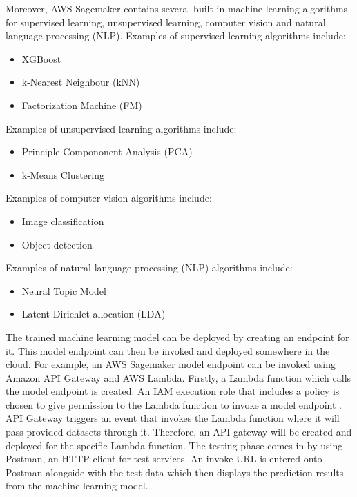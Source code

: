 Moreover, AWS Sagemaker contains several built-in machine learning algorithms for supervised learning, unsupervised learning, computer vision and natural language processing (NLP). Examples of supervised learning algorithms include:
\begin{itemize}
    \item XGBoost
    \item k-Nearest Neighbour (kNN)
    \item Factorization Machine (FM)
\end{itemize}
Examples of unsupervised learning algorithms include:
\begin{itemize}
    \item Principle Compononent Analysis (PCA)
    \item k-Means Clustering
\end{itemize}
Examples of computer vision algorithms include:
\begin{itemize}
    \item Image classification
    \item Object detection
\end{itemize}
Examples of natural language processing (NLP) algorithms include:
\begin{itemize}
    \item Neural Topic Model
    \item Latent Dirichlet allocation (LDA)
\end{itemize}
The trained machine learning model can be deployed by creating an endpoint for it. This model endpoint can then be invoked and deployed somewhere in the cloud. For example, an AWS Sagemaker model endpoint can be invoked using Amazon API Gateway and AWS Lambda. Firstly, a Lambda function which calls the model endpoint is created. An IAM execution role that includes a policy is chosen to give permission to the Lambda function to invoke a model endpoint \cite{engdahl_2008}. API Gateway triggers an event that invokes the Lambda function where it will pass provided datasets through it. Therefore, an API gateway will be created and deployed for the specific Lambda function. The testing phase comes in by using Postman, an HTTP client for test services. An invoke URL is entered onto Postman alongside with the test data which then displays the prediction results from the machine learning model.

